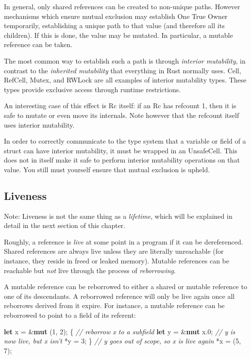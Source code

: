 \documentclass[a4paper,]{book}
\newenvironment{Shaded}{\begin{snugshade}}{\end{snugshade}}
\newcommand{\KeywordTok}[1]{\textcolor[rgb]{0.13,0.29,0.53}{\textbf{{#1}}}}
\newcommand{\DecValTok}[1]{\textcolor[rgb]{0.00,0.00,0.81}{{#1}}}
\newcommand{\CommentTok}[1]{\textcolor[rgb]{0.56,0.35,0.01}{\textit{{#1}}}}
\newcommand{\NormalTok}[1]{{#1}}
\begin{document}
In general, only shared references can be created to non-unique paths.
However mechanisms which ensure mutual exclusion may establish One True
Owner temporarily, establishing a unique path to that value (and
therefore all its children). If this is done, the value may be mutated.
In particular, a mutable reference can be taken.

The most common way to establish such a path is through \emph{interior
mutability}, in contrast to the \emph{inherited mutability} that
everything in Rust normally uses. Cell, RefCell, Mutex, and RWLock are
all examples of interior mutability types. These types provide exclusive
access through runtime restrictions.

An interesting case of this effect is Rc itself: if an Rc has refcount
1, then it is safe to mutate or even move its internals. Note however
that the refcount itself uses interior mutability.

In order to correctly communicate to the type system that a variable or
field of a struct can have interior mutability, it must be wrapped in an
UnsafeCell. This does not in itself make it safe to perform interior
mutability operations on that value. You still must yourself ensure that
mutual exclusion is upheld.

\subsection{Liveness}\label{liveness}

Note: Liveness is not the same thing as a \emph{lifetime}, which will be
explained in detail in the next section of this chapter.

Roughly, a reference is \emph{live} at some point in a program if it can
be dereferenced. Shared references are always live unless they are
literally unreachable (for instance, they reside in freed or leaked
memory). Mutable references can be reachable but \emph{not} live through
the process of \emph{reborrowing}.

A mutable reference can be reborrowed to either a shared or mutable
reference to one of its descendants. A reborrowed reference will only be
live again once all reborrows derived from it expire. For instance, a
mutable reference can be reborrowed to point to a field of its referent:

\begin{Shaded}
\begin{Highlighting}[]
\KeywordTok{let} \NormalTok{x = &}\KeywordTok{mut} \NormalTok{(}\DecValTok{1}\NormalTok{, }\DecValTok{2}\NormalTok{);}
\NormalTok{\{}
    \CommentTok{// reborrow x to a subfield}
    \KeywordTok{let} \NormalTok{y = &}\KeywordTok{mut} \NormalTok{x.}\DecValTok{0}\NormalTok{;}
    \CommentTok{// y is now live, but x isn't}
    \NormalTok{*y = }\DecValTok{3}\NormalTok{;}
\NormalTok{\}}
\CommentTok{// y goes out of scope, so x is live again}
\NormalTok{*x = (}\DecValTok{5}\NormalTok{, }\DecValTok{7}\NormalTok{);}
\end{Highlighting}
\end{Shaded}
\end{document}
